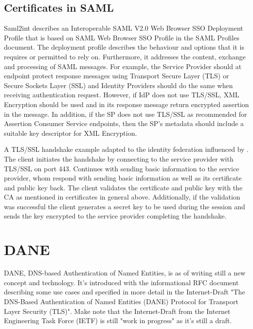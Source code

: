 \subsection{Certificates in SAML}

Saml2int\cite{website:saml2int} describes an Interoperable SAML V2.0 Web Browser SSO Deployment Profile that is based on 
SAML Web Browser SSO Profile in the SAML Profiles document\cite{pdf:oasis-open-profiles}. 
The deployment profile describes the behaviour and options that it is requires or permitted to rely on. 
Furthermore, it addresses the content, exchange and processing of SAML messages.
For example\cite{website:saml2int}, the Service Provider should at endpoint protect response 
messages using Transport Secure Layer (TLS) or Secure Sockets Layer (SSL)  and Identity Providers should do the same when receiving 
authentication request. 
However, if IdP does not use TLS/SSL, XML Encryption should be used and in its response 
message return encrypted assertion in the message. 
In addition, if the SP does not use TLS/SSL as recommended for Assertion Consumer Service
endpoints, then the SP's metadata should include a suitable key descriptor for XML Encryption.

A TLS/SSL handshake example adapted to the identity federation influenced by \cite{website:ssl_explained}.
The client initiates the handshake by connecting to the service provider with TLS/SSL on port 443. 
Continues with sending basic information to the service provider, whom respond with sending basic 
information as well as its certificate and public key back. 
The client validates the certificate and public key with the CA as mentioned in certificates in general above. 
Additionally, if the validation was successful the client generates a secret key to be used during the session and 
sends the key encrypted to the service provider completing the handshake. 

\section{DANE} 
DANE, DNS-based Authentication of Named Entities, is as of writing still a new concept and technology.
It's introduced with the informational RFC document\cite{rfc:6394} describing some use cases and specified in more detail in the Internet-Draft "The DNS-Based Authentication of Named Entities (DANE) Protocol for Transport Layer Security (TLS)"\cite{rfc:draft-dane}.
Make note that the Internet-Draft from the Internet Engineering Task Force (IETF) is still "work in progress" as it's still a draft.

